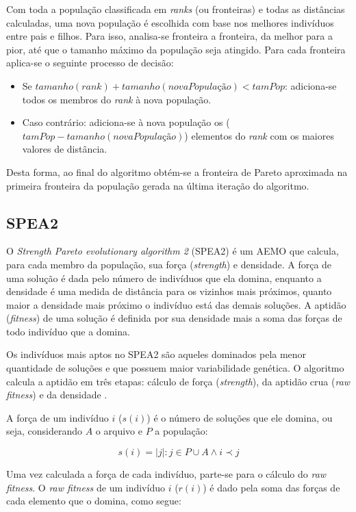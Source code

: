 Com toda a população classificada em \textit{ranks} (ou fronteiras) e todas as distâncias calculadas, uma nova população é escolhida com base nos melhores indivíduos entre pais e filhos. Para isso, analisa-se fronteira a fronteira, da melhor para a pior, até que o tamanho máximo da população seja atingido. Para cada fronteira aplica-se o seguinte processo de decisão:

\begin{itemize}  
	\item Se $tamanho(rank) + tamanho(novaPopulação) < tamPop$: adiciona-se todos os membros do \textit{rank} à nova população.
	\item Caso contrário: adiciona-se à nova população os ($tamPop - tamanho(novaPopulação)$) elementos do \textit{rank} com os maiores valores de distância.
\end{itemize}

Desta forma, ao final do algoritmo obtém-se a fronteira de Pareto aproximada na primeira fronteira da população gerada na última iteração do algoritmo.

\subsection{SPEA2}

O \textit{Strength Pareto evolutionary algorithm 2} (SPEA2) \cite{Zitzler2002} é um AEMO que calcula, para cada membro da população, sua força (\textit{strength}) e densidade. A força de uma solução é dada pelo número de indivíduos que ela domina, enquanto a densidade é uma medida de distância para os vizinhos mais próximos, quanto maior a densidade mais próximo o indivíduo está das demais soluções. A aptidão (\textit{fitness}) de uma solução é definida por sua densidade mais a soma das forças de todo indivíduo que a domina. 

Os indivíduos mais aptos no SPEA2 são aqueles dominados pela menor quantidade de soluções e que possuem maior variabilidade genética. O algoritmo calcula a aptidão em três etapas: cálculo de força (\textit{strength}), da aptidão crua (\textit{raw fitness}) e da densidade \cite{Zitzler2002}.

A força de um indivíduo $i$ ($s(i)$) é o número de soluções que ele domina, ou seja, considerando $A$ o arquivo e $P$ a população:

\[ s(i) = |j|: j \in P \cup A \land i \prec j \]

Uma vez calculada a força de cada indivíduo, parte-se para o cálculo do \textit{raw fitness}. O \textit{raw fitness} de um indivíduo $i$ ($r(i)$) é dado pela soma das forças de cada elemento que o domina, como segue:

